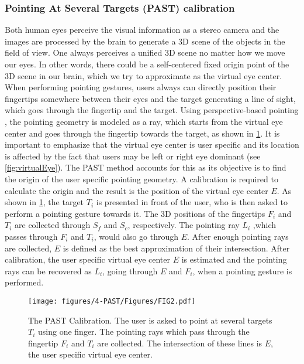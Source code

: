 \subsubsection{Pointing At Several Targets (PAST) calibration} \label{sec:4:PAST}
Both human eyes perceive the visual information as a stereo camera and the images are processed by the brain to generate a 3D scene of the objects in the field of view. One always perceives a unified 3D scene no matter how we move our eyes. In other words, there could be a self-centered fixed origin point of the 3D scene in our brain, which we try to approximate as the virtual eye center. When performing pointing gestures, users always can directly position their fingertips somewhere between their eyes and the target generating a line of sight, which goes through the fingertip and the target. Using perspective-based pointing  \citep{Pierce1997},  the pointing geometry is modeled as a ray, which starts from the virtual eye center and goes through the fingertip towards the target, as shown in \figurename{ \ref{fig:past:calibration}}. It is important to emphasize that the virtual eye center is user specific and its location is affected by the fact that users may be left or right eye dominant (see \figurename{ \ref{fig:virtualEye}}).
The PAST method accounts for this as its objective is to find the origin of the user specific pointing geometry. 
A calibration is required to calculate the origin and the result is the position of the virtual eye center $E$. 
As shown in \figurename{ \ref{fig:past:calibration}}, the target $T_i$ is presented in front of the user, who is then asked to perform a pointing gesture towards it. The 3D positions of the fingertips $F_i$ and $T_i$ are collected through $S_f$ and $S_c$, respectively. The pointing ray $L_i$ ,which passes through $F_i$ and $T_i$, would also go through $E$. After enough pointing rays are collected, $E$ is defined as the best approximation of their intersection. After calibration, the user specific virtual eye center $E$ is estimated and the pointing rays can be recovered as $L_{i}$, going through $E$ and  $F_i$, when a pointing gesture is performed.
\begin{figure} 
	\centering
	\texttt{[image: figures/4-PAST/Figures/FIG2.pdf]}
	\caption{The PAST Calibration. The user is asked to point at several targets $T_i$ using one finger. The pointing rays which pass through the fingertip $F_i$ and $T_i$ are collected. The intersection of these lines is $E$, the user specific virtual eye center.}
	\label{fig:past:calibration}
\end{figure}
